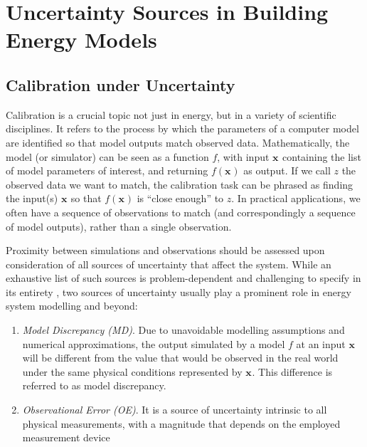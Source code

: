 \documentclass[preprint,12pt, sort&compress]{elsarticle}
\newcommand{\bd}[1]{\boldsymbol{#1}}
\newcommand{\x}[1][]{\bd{x_{#1}}}
\begin{document}

\section{Uncertainty Sources in Building Energy Models}
\label{Sec_Uncertainty}


\subsection{Calibration under Uncertainty}

Calibration is a crucial topic not just in energy, but in a variety of scientific disciplines. It refers to the process by which the parameters of a computer model are identified so that model outputs match observed data. Mathematically, the model (or simulator) can be seen as a function $f$, with input $\x$ containing the list of model parameters of interest, and returning $f(\x)$ as output. If we call $z$ the observed data we want to match, the calibration task can be phrased as finding the input(s) $\x$ so that $f(\x)$ is “close enough” to $z$. In practical applications, we often have a sequence of observations to match (and correspondingly a sequence of model outputs), rather than a single observation.

Proximity between simulations and observations should be assessed upon consideration of all sources of uncertainty that affect the system. While an exhaustive list of such sources is problem-dependent and challenging to specify in its entirety \cite{kennedy2001}, two sources of uncertainty usually play a prominent role in energy system modelling and beyond:
\begin{enumerate}
\item \emph{Model Discrepancy (MD)}. Due to unavoidable modelling assumptions and numerical approximations, the output  simulated by a model $f$ at an input $\x$ will be different from the value that would be observed in the real world under the same physical conditions represented by $\x$. This difference is referred to as model discrepancy.
\item \emph{Observational Error (OE)}. It is a source of uncertainty intrinsic to all physical measurements, with a magnitude that depends on the employed measurement device
\end{enumerate}
\end{document}
